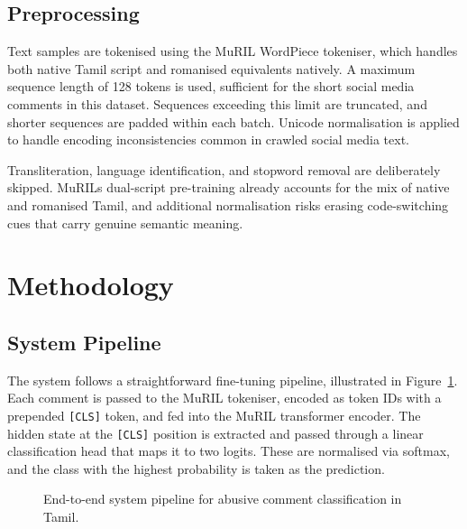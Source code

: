 \documentclass[11pt]{article}
\begin{document}
\subsection{Preprocessing}
Text samples are tokenised using the MuRIL WordPiece tokeniser, which handles both
native Tamil script and romanised equivalents natively. A maximum sequence length of
128 tokens is used, sufficient for the short social media comments in this dataset.
Sequences exceeding this limit are truncated, and shorter sequences are padded within
each batch. Unicode normalisation is applied to handle encoding inconsistencies common
in crawled social media text.

Transliteration, language identification, and stopword removal are deliberately skipped.
MuRIL\textquotesingle{}s dual-script pre-training already accounts for the mix of
native and romanised Tamil, and additional normalisation risks erasing code-switching
cues that carry genuine semantic meaning.

\section{Methodology}

\subsection{System Pipeline}
The system follows a straightforward fine-tuning pipeline, illustrated in
Figure~\ref{fig:pipeline}. Each comment is passed to the MuRIL tokeniser, encoded
as token IDs with a prepended \texttt{[CLS]} token, and fed into the MuRIL transformer
encoder. The hidden state at the \texttt{[CLS]} position is extracted and passed through
a linear classification head that maps it to two logits. These are normalised via
softmax, and the class with the highest probability is taken as the prediction.

\begin{figure}[H]
\centering
{}
\caption{End-to-end system pipeline for abusive comment classification in Tamil.}
\label{fig:pipeline}
\end{figure}
\end{document}
